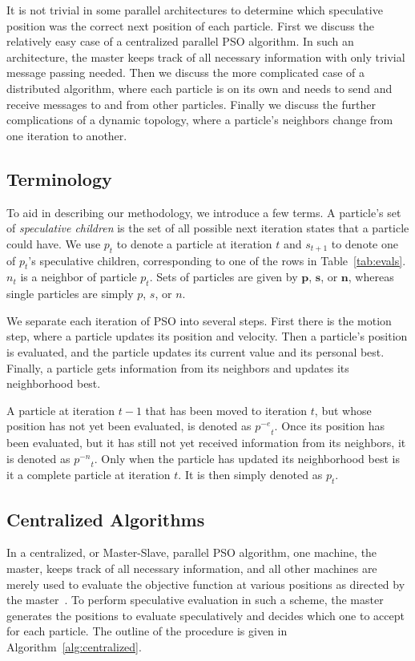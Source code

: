 \documentclass[journal,letterpaper]{IEEEtran}
\newcommand{\alg}[1]{Algorithm~\ref{alg:#1}}
\providecommand{\noeval}[1]{\ensuremath{#1^{-e}}}
\providecommand{\nonbest}[1]{\ensuremath{#1^{-n}}}
\providecommand{\p}{\ensuremath{p}}
\providecommand{\pset}{\ensuremath{\mathbf{p}}}
\providecommand{\s}{\ensuremath{s}}
\providecommand{\sset}{\ensuremath{\mathbf{s}}}
\providecommand{\n}{\ensuremath{n}}
\providecommand{\nset}{\ensuremath{\mathbf{n}}}
\begin{document}
It is not trivial in some parallel architectures to determine which speculative
position was the correct next position of each particle.  First we discuss the
relatively easy case of a centralized parallel PSO algorithm.  In such an
architecture, the master keeps track of all necessary information with only
trivial message passing needed.  Then we discuss the more complicated case of a
distributed algorithm, where each particle is on its own and needs to send and
receive messages to and from other particles.  Finally we discuss the further
complications of a dynamic topology, where a particle's neighbors change from
one iteration to another.

\subsection{Terminology}

To aid in describing our methodology, we introduce a few terms.  A particle's
set of \emph{speculative children} is the set of all possible next iteration
states that a particle could have.  We use $\p_t$ to denote a particle at
iteration $t$ and $\s_{t+1}$ to denote one of $\p_t$'s speculative children,
corresponding to one of the rows in Table~\ref{tab:evals}.  $\n_t$ is a
neighbor of particle $\p_t$.  Sets of particles are given by $\pset$, $\sset$,
or $\nset$, whereas single particles are simply $\p$, $\s$, or $\n$.

We separate each iteration of PSO into several steps.  First there is the
motion step, where a particle updates its position and velocity.  Then a
particle's position is evaluated, and the particle updates its current value
and its personal best.  Finally, a particle gets information from its neighbors
and updates its neighborhood best.

A particle at iteration $t-1$ that has been moved to iteration $t$, but whose
position has not yet been evaluated, is denoted as $\noeval{\p}_t$.  Once its
position has been evaluated, but it has still not yet received information from
its neighbors, it is denoted as $\nonbest{\p}_t$.  Only when the particle has
updated its neighborhood best is it a complete particle at iteration $t$.  It is
then simply denoted as $\p_t$.

\subsection{Centralized Algorithms}

In a centralized, or Master-Slave, parallel PSO algorithm, one machine, the
master, keeps track of all necessary information, and all other machines are
merely used to evaluate the objective function at various positions as directed
by the master~\cite{belal-ijicis04}.  To perform speculative evaluation in such
a scheme, the master generates the positions to evaluate speculatively and
decides which one to accept for each particle.  The outline of the procedure is
given in \alg{centralized}.
\end{document}
